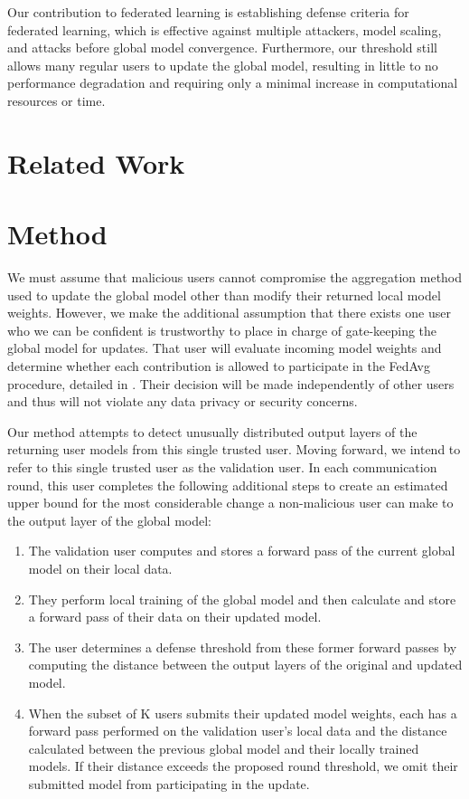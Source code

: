 \documentclass{article} %
\begin{document}
Our contribution to federated learning is establishing defense criteria for federated learning, which is effective against multiple attackers, model scaling, and attacks before global model convergence. Furthermore, our threshold still allows many regular users to update the global model, resulting in little to no performance degradation and requiring only a minimal increase in computational resources or time.

%
\section{Related Work}


%
\section{Method}

We must assume that malicious users cannot compromise the aggregation method used to update the global model other than modify their returned local model weights. However, we make the additional assumption that there exists one user who we can be confident is trustworthy to place in charge of gate-keeping the global model for updates. That user will evaluate incoming model weights and determine whether each contribution is allowed to participate in the FedAvg procedure, detailed in \cite{fedavg}. Their decision will be made independently of other users and thus will not violate any data privacy or security concerns.

Our method attempts to detect unusually distributed output layers of the returning user models from this single trusted user. Moving forward, we intend to refer to this single trusted user as the validation user. In each communication round, this user completes the following additional steps to create an estimated upper bound for the most considerable change a non-malicious user can make to the output layer of the global model:
\begin{enumerate}
    \item The validation user computes and stores a forward pass of the current global model on their local data.
    \item They perform local training of the global model and then calculate and store a forward pass of their data on their updated model.
    \item The user determines a defense threshold from these former forward passes by computing the distance between the output layers of the original and updated model.
    \item When the subset of K users submits their updated model weights, each has a forward pass performed on the validation user's local data and the distance calculated between the previous global model and their locally trained models. If their distance exceeds the proposed round threshold, we omit their submitted model from participating in the update. 
\end{enumerate}
\end{document}

